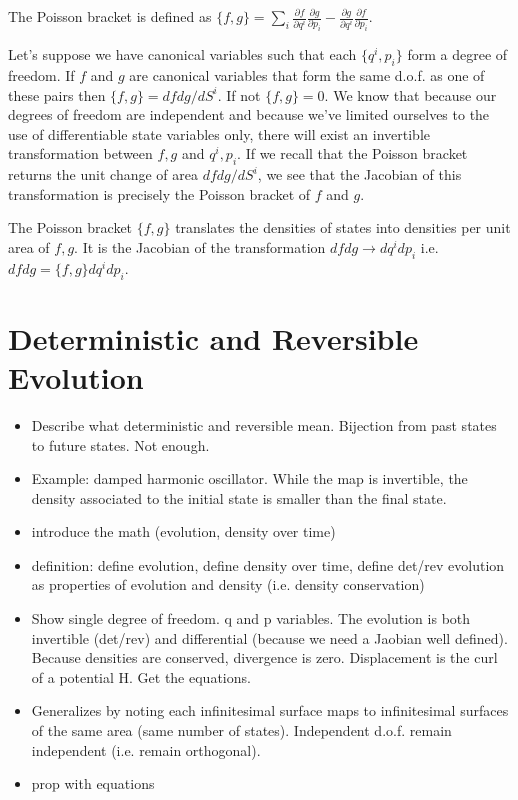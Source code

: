 \documentclass{article}
\begin{document}
\begin{defn}
	The Poisson bracket is defined as $\{f,g\} = \sum_i \frac{\partial f}{\partial q^i}\frac{\partial g}{\partial p_i} - \frac{\partial g}{\partial q^i}\frac{\partial f}{\partial p_i}$.
\end{defn}

	Let's suppose we have canonical variables such that each $\{q^i,p_i\}$ form a degree of freedom. If $f$ and $g$ are canonical variables that form the same d.o.f. as one of these pairs then $\{f,g \} = dfdg/dS^i$. If not $\{f,g \} = 0$. We know that because our degrees of freedom are independent and because we've limited ourselves to the use of differentiable state variables only, there will exist an invertible transformation between $f,g$ and $q^i,p_i$. If we recall that the Poisson bracket returns the unit change of area $dfdg/dS^i$, we see that the Jacobian of this transformation is precisely the Poisson bracket of $f$ and $g$.

\begin{prop}
	The Poisson bracket $\{f, g\}$ translates the densities of states into densities per unit area of $f, g$. It is the Jacobian of the transformation $dfdg \rightarrow dq^idp_i$ i.e. $dfdg = \{f,g\}dq^idp_i$.
\end{prop}
	
\section{Deterministic and Reversible Evolution}

\begin{itemize}
	\item Describe what deterministic and reversible mean. Bijection from past states to future states. Not enough.
	
	\item Example: damped harmonic oscillator. While the map is invertible, the density associated to the initial state is smaller than the final state.
	
	\item introduce the math (evolution, density over time)
	
	\item definition: define evolution, define density over time, define det/rev evolution as properties of evolution and density (i.e. density conservation)
	
	\item Show single degree of freedom. q and p variables. The evolution is both invertible (det/rev) and differential (because we need a Jaobian well defined). Because densities are conserved, divergence is zero. Displacement is the curl of a potential H. Get the equations.
	
	\item Generalizes by noting each infinitesimal surface maps to infinitesimal surfaces of the same area (same number of states). Independent d.o.f. remain independent (i.e. remain orthogonal).
	
	\item prop with equations
	
\end{itemize}
\end{document}

